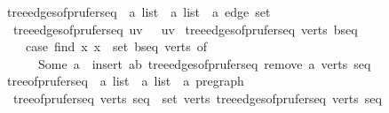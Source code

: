 \begin{isabellebox}
    \isamarkupfalse%
    \ tree{\isacharunderscore}{\kern0pt}edges{\isacharunderscore}{\kern0pt}of{\isacharunderscore}{\kern0pt}prufer{\isacharunderscore}{\kern0pt}seq\ {\isacharcolon}{\kern0pt}{\isacharcolon}{\kern0pt}\ {\isachardoublequoteopen}{\isacharprime}{\kern0pt}a\ list\ {\isasymRightarrow}\ {\isacharprime}{\kern0pt}a\ list\ {\isasymRightarrow}\ {\isacharprime}{\kern0pt}a\ edge\ set{\isachardoublequoteclose}\ \isanewline
    \ \ {\isachardoublequoteopen}tree{\isacharunderscore}{\kern0pt}edges{\isacharunderscore}{\kern0pt}of{\isacharunderscore}{\kern0pt}prufer{\isacharunderscore}{\kern0pt}seq\ {\isacharbrackleft}{\kern0pt}u{\isacharcomma}{\kern0pt}v{\isacharbrackright}{\kern0pt}\ {\isacharbrackleft}{\kern0pt}{\isacharbrackright}{\kern0pt}\ {\isacharequal}{\kern0pt}\ {\isacharbraceleft}{\kern0pt}{\isacharbraceleft}{\kern0pt}u{\isacharcomma}{\kern0pt}v{\isacharbraceright}{\kern0pt}{\isacharbraceright}{\kern0pt}{\isachardoublequoteclose}\isanewline
    {\isacharbar}{\kern0pt}\ {\isachardoublequoteopen}tree{\isacharunderscore}{\kern0pt}edges{\isacharunderscore}{\kern0pt}of{\isacharunderscore}{\kern0pt}prufer{\isacharunderscore}{\kern0pt}seq\ verts\ {\isacharparenleft}{\kern0pt}b{\isacharhash}{\kern0pt}seq{\isacharparenright}{\kern0pt}\ {\isacharequal}{\kern0pt}\isanewline
    \ \ \ \ {\isacharparenleft}{\kern0pt}case\ find\ {\isacharparenleft}{\kern0pt}{\isasymlambda}x{\isachardot}{\kern0pt}\ x\ {\isasymnotin}\ set\ {\isacharparenleft}{\kern0pt}b{\isacharhash}{\kern0pt}seq{\isacharparenright}{\kern0pt}{\isacharparenright}{\kern0pt}\ verts\ of\isanewline
    \ \ \ \ \ \ Some\ a\ {\isasymRightarrow}\ insert\ {\isacharbraceleft}{\kern0pt}a{\isacharcomma}{\kern0pt}b{\isacharbraceright}{\kern0pt}\ {\isacharparenleft}{\kern0pt}tree{\isacharunderscore}{\kern0pt}edges{\isacharunderscore}{\kern0pt}of{\isacharunderscore}{\kern0pt}prufer{\isacharunderscore}{\kern0pt}seq\ {\isacharparenleft}{\kern0pt}remove{}\ a\ verts{\isacharparenright}{\kern0pt}\ seq{\isacharparenright}{\kern0pt}{\isacharparenright}{\kern0pt}{\isachardoublequoteclose}\isanewline
    \isanewline
    \isamarkupfalse%
    \ tree{\isacharunderscore}{\kern0pt}of{\isacharunderscore}{\kern0pt}prufer{\isacharunderscore}{\kern0pt}seq\ {\isacharcolon}{\kern0pt}{\isacharcolon}{\kern0pt}\ {\isachardoublequoteopen}{\isacharprime}{\kern0pt}a\ list\ {\isasymRightarrow}\ {\isacharprime}{\kern0pt}a\ list\ {\isasymRightarrow}\ {\isacharprime}{\kern0pt}a\ pregraph{\isachardoublequoteclose}\ \isanewline
    \ \ {\isachardoublequoteopen}tree{\isacharunderscore}{\kern0pt}of{\isacharunderscore}{\kern0pt}prufer{\isacharunderscore}{\kern0pt}seq\ verts\ seq\ {\isacharequal}{\kern0pt}\ {\isacharparenleft}{\kern0pt}set\ verts{\isacharcomma}{\kern0pt}\ tree{\isacharunderscore}{\kern0pt}edges{\isacharunderscore}{\kern0pt}of{\isacharunderscore}{\kern0pt}prufer{\isacharunderscore}{\kern0pt}seq\ verts\ seq{\isacharparenright}{\kern0pt}{\isachardoublequoteclose}
\end{isabellebox}

